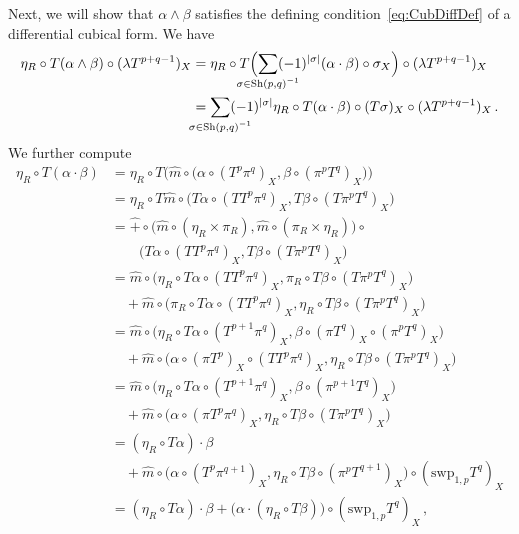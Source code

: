 \documentclass[12pt,reqno, a4paper]{amsart}
\numberwithin{equation}{section}
\theoremstyle{plain}
\theoremstyle{definition}
\theoremstyle{remark}
\DeclareMathOperator{\Shuff}{Sh}
\newcommand{\Val}{\eta}
\newcommand{\Rmult}{\hat{m}}
\newcommand{\Radd}{\hat{+}}
\newcommand{\Swp}{\mathrm{swp}}
\begin{document}
Next, we will show that $\alpha \wedge \beta$ satisfies the defining condition~\eqref{eq:CubDiffDef} of a differential cubical form. We have
\begin{equation}
\label{eq:WedgeDiff01}
\begin{split}
  \Val_R \circ T(\alpha \wedge \beta) \circ (\lambda T^{p+q-1})_X
  &=
  \Val_R \circ T\Bigl(
    \sum_{\mathclap{\sigma \in \Shuff(p,q)^{-1}}} (-1)^{|\sigma|}
    (\alpha \cdot \beta) \circ \sigma_X \Bigr) \circ (\lambda T^{p+q-1})_X  \\
  &=
  \sum_{\mathclap{\sigma \in \Shuff(p,q)^{-1}}}
  (-1)^{|\sigma|}
  \Val_R \circ T(\alpha \cdot \beta) \circ (T\sigma)_X \circ (\lambda T^{p+q-1})_X
  \,.
\end{split}
\end{equation}
We further compute
\begin{equation}
\label{eq:TDerProd}
\begin{split}
  \Val_R \circ T(\alpha \cdot \beta)
  &=
  \Val_R \circ
  T\bigl( \Rmult\circ\bigl(\alpha\circ (T^p\pi^q)_X,\beta\circ(\pi^pT^q)_X\bigr) \bigr)
  \\
  &=
  \Val_R \circ
  T\Rmult
  \circ \bigl(
  T\alpha\circ (TT^p\pi^q)_X,
  T\beta \circ (T\pi^pT^q)_X \bigr)
  \\
  &=
  \Radd \circ \bigl( \Rmult \circ (\Val_R \times \pi_R),
  \Rmult \circ (\pi_R \times \Val_R) \bigr)
  \circ
  \\
  &\qquad{} \bigl(
  T\alpha\circ (TT^p\pi^q)_X,
  T\beta \circ (T\pi^pT^q)_X \bigr)
  \\
  &=
  \Rmult \circ \bigl(
    \Val_R \circ T \alpha\circ (TT^p\pi^q)_X,
    \pi_R \circ  T\beta \circ (T\pi^pT^q)_X \bigr)
  \\
  &\quad{} +
  \Rmult \circ \bigl(
    \pi_R \circ T\alpha \circ (TT^p\pi^q)_X,
    \Val_R \circ T\beta \circ (T\pi^pT^q)_X \bigr)
  \\
  &=
  \Rmult \circ \bigl(
    \Val_R \circ T\alpha \circ (T^{p+1}\pi^q)_X,
    \beta \circ (\pi T^q)_X \circ (\pi^p T^q)_X \bigr)
  \\
  &\quad{} +
  \Rmult \circ \bigl(
    \alpha \circ (\pi T^p)_X \circ (TT^p\pi^q)_X,
    \Val_R \circ  T\beta \circ (T\pi^pT^q)_X \bigr)
  \\
  &=
  \Rmult \circ \bigl(
    \Val_R \circ T\alpha \circ (T^{p+1}\pi^q)_X,
    \beta \circ (\pi^{p+1} T^q)_X \bigr)
  \\
  &\quad{} +
  \Rmult \circ \bigl(
    \alpha \circ (\pi T^p\pi^q)_X,
    \Val_R \circ  T\beta \circ (T\pi^pT^q)_X \bigr)
  \\
  &=
    (\Val_R \circ T\alpha) \cdot \beta
  \\
  &\quad{}
  + \Rmult \circ \bigl(
    \alpha \circ (T^p \pi^{q+1})_X,
    \Val_R \circ T\beta \circ (\pi^p T^{q+1})_X \bigr)
    \circ (\Swp_{1,p} T^q)_X
  \\
  &=
    (\Val_R \circ T\alpha) \cdot \beta
    + \bigl(\alpha \cdot (\Val_R \circ T\beta)\bigr) \circ (\Swp_{1,p}T^q)_X
  \,,
\end{split}
\end{equation}
\end{document}
